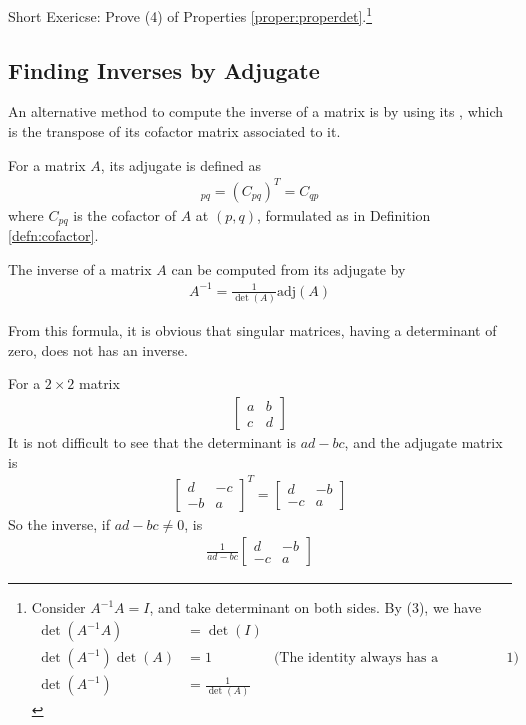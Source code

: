 Short Exericse: Prove (4) of Properties \ref{proper:properdet}.\footnote{Consider $A^{-1}A=I$, and take determinant on both sides. By (3), we have
\begin{align*}
\det(A^{-1}A) &= \det(I) \\
\det(A^{-1})\det(A) &= 1 & \text{(The identity always has a determinant of $1$)} \\
\det(A^{-1}) &= \frac{1}{\det(A)}
\end{align*}}

\subsection{Finding Inverses by Adjugate}
An alternative method to compute the inverse of a matrix is by using its , which is the transpose of its cofactor matrix associated to it.
\begin{defn}[Adjugate]
For a matrix $A$, its adjugate is defined as
\begin{align*}
[\text{adj}(A)]_{pq} = (C_{pq})^T = C_{qp}
\end{align*}
where $C_{pq}$ is the cofactor of $A$ at $(p, q)$, formulated as in Definition \ref{defn:cofactor}.
\end{defn}
\begin{proper}
\label{proper:invadj}
The inverse of a matrix $A$ can be computed from its adjugate by
\begin{align*}
A^{-1} = \frac{1}{\det(A)}\text{adj}(A)
\end{align*}
\end{proper}
From this formula, it is obvious that singular matrices, having a determinant of zero, does not has an inverse.
\begin{exmp}
\label{exmp:2x2}
For a $2 \times 2$ matrix
\begin{align*}
\begin{bmatrix}
a & b \\
c & d
\end{bmatrix}    
\end{align*}
It is not difficult to see that the determinant is $ad - bc$, and the adjugate matrix is
\begin{align*}
\begin{bmatrix}
d & -c \\
-b & a 
\end{bmatrix}^T = 
\begin{bmatrix}
d & -b \\
-c & a 
\end{bmatrix}    
\end{align*}
So the inverse, if $ad - bc \neq 0$, is
\begin{align*}
\frac{1}{ad-bc}
\begin{bmatrix}
d & -b \\
-c & a 
\end{bmatrix}
\end{align*}
\end{exmp}

